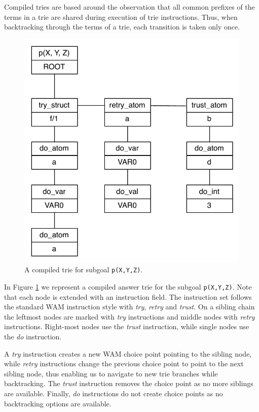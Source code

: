Compiled tries are based around the observation that all common prefixes of the terms in a trie
are shared during execution of trie instructions. Thus, when backtracking
through the terms of a trie, each transition is taken only once.

\begin{figure}[H]
  \centering
    \includegraphics[scale=0.6]{compiled_trie.pdf}
  \caption{A compiled trie for subgoal \texttt{p(X,Y,Z)}.}
  \label{fig:compiled_trie}
\end{figure}

In Figure \ref{fig:compiled_trie} we represent a compiled answer trie for the subgoal
\texttt{p(X,Y,Z)}. Note that each node is extended with an instruction field.
The instruction set follows the standard WAM instruction style with \textit{try},
\textit{retry} and \textit{trust}.
On a sibling chain the leftmost nodes are marked with \textit{try} instructions and middle
nodes with \textit{retry} instructions. Right-most nodes use the \textit{trust} instruction,
while single nodes use the \textit{do} instruction.

A \textit{try} instruction creates a new WAM choice point pointing to the sibling node,
while \textit{retry} instructions change the previous choice point to point to the next sibling node,
thus enabling us to navigate to new trie branches while backtracking. The \textit{trust}
instruction removes the choice point as no more siblings are available. Finally, \textit{do}
instructions do not create choice points as no backtracking options are available.

